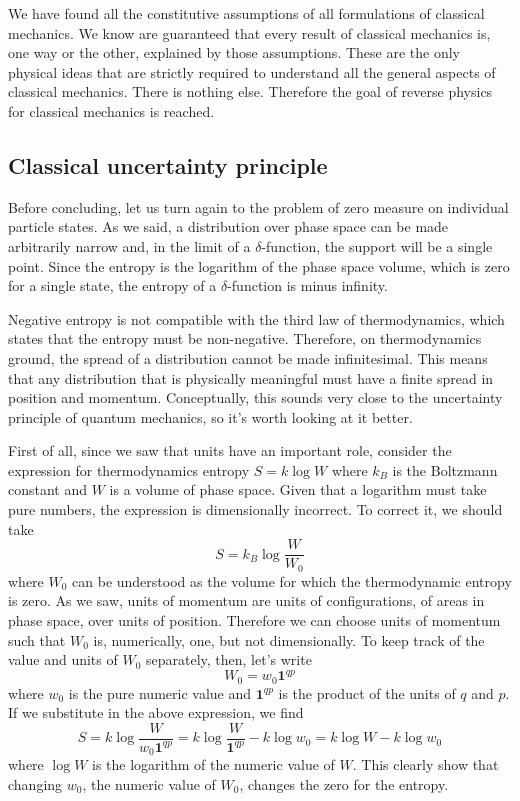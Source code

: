 We have found all the constitutive assumptions of all formulations of classical mechanics. We know are guaranteed that every result of classical mechanics is, one way or the other, explained by those assumptions. These are the only physical ideas that are strictly required to understand all the general aspects of classical mechanics. There is nothing else. Therefore the goal of reverse physics for classical mechanics is reached.

\subsection{Classical uncertainty principle}

Before concluding, let us turn again to the problem of zero measure on individual particle states. As we said, a distribution over phase space can be made arbitrarily narrow and, in the limit of a $\delta$-function, the support will be a single point. Since the entropy is the logarithm of the phase space volume, which is zero for a single state, the entropy of a $\delta$-function is minus infinity.

Negative entropy is not compatible with the third law of thermodynamics, which states that the entropy must be non-negative. Therefore, on thermodynamics ground, the spread of a distribution cannot be made infinitesimal. This means that any distribution that is physically meaningful must have a finite spread in position and momentum. Conceptually, this sounds very close to the uncertainty principle of quantum mechanics, so it's worth looking at it better.

First of all, since we saw that units have an important role, consider the expression for thermodynamics entropy $S=k \log W$ where $k_B$ is the Boltzmann constant and $W$ is a volume of phase space. Given that a logarithm must take pure numbers, the expression is dimensionally incorrect. To correct it, we should take
\begin{equation}
	S = k_B \log \frac{W}{W_0}
\end{equation}
where $W_0$ can be understood as the volume for which the thermodynamic entropy is zero. As we saw, units of momentum are units of configurations, of areas in phase space, over units of position. Therefore we can choose units of momentum such that $W_0$ is, numerically, one, but not dimensionally. To keep track of the value and units of $W_0$ separately, then, let's write
\begin{equation}
	W_0 = w_0 \textbf{1}^{qp}
\end{equation}
where $w_0$ is the pure numeric value and $\textbf{1}^{qp}$ is the product of the units of $q$ and $p$. If we substitute in the above expression, we find
\begin{equation}
	S = k \log \frac{W}{w_0 \textbf{1}^{qp}} = k \log \frac{W}{\textbf{1}^{qp}} - k \log w_0 = k \log W - k \log w_0
\end{equation}
where $\log W$ is the logarithm of the numeric value of $W$. This clearly show that changing $w_0$, the numeric value of $W_0$, changes the zero for the entropy.

